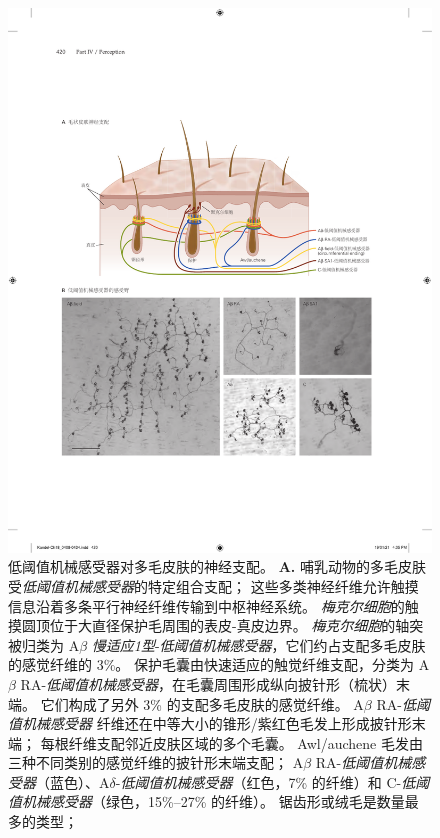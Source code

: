 \begin{figure}[htbp]
	\centering
	\includegraphics[width=1.0\linewidth]{chap18/fig_18_8}
	\caption{低阈值机械感受器对多毛皮肤的神经支配。
		\textbf{A.} 哺乳动物的多毛皮肤受\textit{低阈值机械感受器}的特定组合支配；
		这些多类神经纤维允许触摸信息沿着多条平行神经纤维传输到中枢神经系统。
		\textit{梅克尔细胞}的触摸圆顶位于大直径保护毛周围的表皮-真皮边界。
		\textit{梅克尔细胞}的轴突被归类为 A$\beta$ \textit{慢适应1型}-\textit{低阈值机械感受器}，它们约占支配多毛皮肤的感觉纤维的 3\%。
		保护毛囊由快速适应的触觉纤维支配，分类为 A$\beta$ RA-\textit{低阈值机械感受器}，在毛囊周围形成纵向披针形（梳状）末端。
		它们构成了另外 3\% 的支配多毛皮肤的感觉纤维。
		A$\beta$ RA-\textit{低阈值机械感受器} 纤维还在中等大小的锥形/紫红色毛发上形成披针形末端； 每根纤维支配邻近皮肤区域的多个毛囊。
		Awl/auchene 毛发由三种不同类别的感觉纤维的披针形末端支配； A$\beta$ RA-\textit{低阈值机械感受器}（蓝色）、A$\delta$-\textit{低阈值机械感受器}（红色，7\% 的纤维）和 C-\textit{低阈值机械感受器}（绿色，15\%–27\% 的纤维）。
		锯齿形或绒毛是数量最多的类型；
}
\end{figure}
